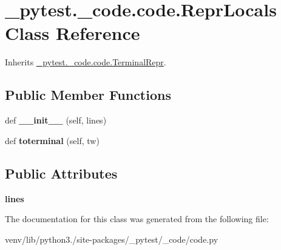 \hypertarget{class__pytest_1_1__code_1_1code_1_1_repr_locals}{}\section{\+\_\+pytest.\+\_\+code.\+code.\+Repr\+Locals Class Reference}
\label{class__pytest_1_1__code_1_1code_1_1_repr_locals}


Inherits \hyperlink{class__pytest_1_1__code_1_1code_1_1_terminal_repr}{\+\_\+pytest.\+\_\+code.\+code.\+Terminal\+Repr}.

\subsection*{Public Member Functions}
\begin{DoxyCompactItemize}
\item 
\mbox{\label{class__pytest_1_1__code_1_1code_1_1_repr_locals_a357a276a4d0b75d4bee0755cceed3ef5}} 
def {\bfseries \+\_\+\+\_\+init\+\_\+\+\_\+} (self, lines)
\item 
\mbox{\label{class__pytest_1_1__code_1_1code_1_1_repr_locals_a19bbf35174e7d6e851dc738b47401b2a}} 
def {\bfseries toterminal} (self, tw)
\end{DoxyCompactItemize}
\subsection*{Public Attributes}
\begin{DoxyCompactItemize}
\item 
\mbox{\label{class__pytest_1_1__code_1_1code_1_1_repr_locals_ac9bb253999169931315d115c0195e2c2}} 
{\bfseries lines}
\end{DoxyCompactItemize}


The documentation for this class was generated from the following file\+:\begin{DoxyCompactItemize}
\item 
venv/lib/python3./site-\/packages/\+\_\+pytest/\+\_\+code/code.\+py\end{DoxyCompactItemize}
